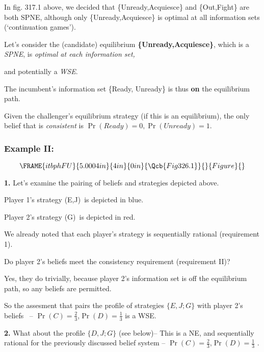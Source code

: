 \documentclass{article}
\begin{document}
In fig. 317.1 above, we decided that \{Unready,Acquiesce\} and \{Out,Fight\}
are both SPNE, although only \{Unready,Acquiesce\} is optimal at all
information sets (`continuation games').

Let's consider the (candidate) equilibrium \textbf{\{Unready,Acquiesce\}},
which is a \textit{SPNE}, is \textit{optimal at each information set,}

and potentially a \textit{WSE}.

The incumbent's information set \{Ready, Unready\} is thus \textbf{on} the
equilibrium path. \ 

Given the challenger's equilibrium strategy (if this is an equilibrium), the
only belief that is \textit{consistent} is $\Pr (Ready)=0,\Pr (Unready)=1.$

\pagebreak

\subsubsection{Example II:\ }

\[
\FRAME{itbphFU}{5.0004in}{4in}{0in}{\Qcb{Fig 326.1}}{}{Figure}{\special%
{language "Scientific Word";type "GRAPHIC";maintain-aspect-ratio
TRUE;display "USEDEF";valid_file "T";width 5.0004in;height 4in;depth
0in;original-width 5.1515in;original-height 4.8161in;cropleft "0";croptop
"1";cropright "1";cropbottom "0";tempfilename
'JSH1WT0B.wmf';tempfile-properties "XPR";}} 
\]

\textbf{1. }Let's examine the pairing of beliefs and strategies depicted
above. \ 

Player 1's strategy (E,J)\ is depicted in blue.

Player 2's strategy (G)\ is depicted in red. \ 

We already noted that each player's strategy is sequentially rational
(requirement 1).

Do player 2's beliefs meet the consistency requirement (requirement II)?

Yes, they do trivially, because player 2's information set is off the
equilibrium path, so any beliefs are permitted.

So the assesment that pairs the profile of strategies $\{E,J;G\}$ with
player 2's beliefs \ -- $\Pr (C)=\frac{2}{3}$,$\Pr (D)=\frac{1}{3}$ is a WSE.

\bigskip \pagebreak

\textbf{2. }What about the profile $\{D,J;G\}$ (see below)-- This is a NE,
and sequentially rational for the previously discussed belief system -- $\Pr
(C)=\frac{2}{3}$,$\Pr (D)=\frac{1}{3}$ .
\end{document}
